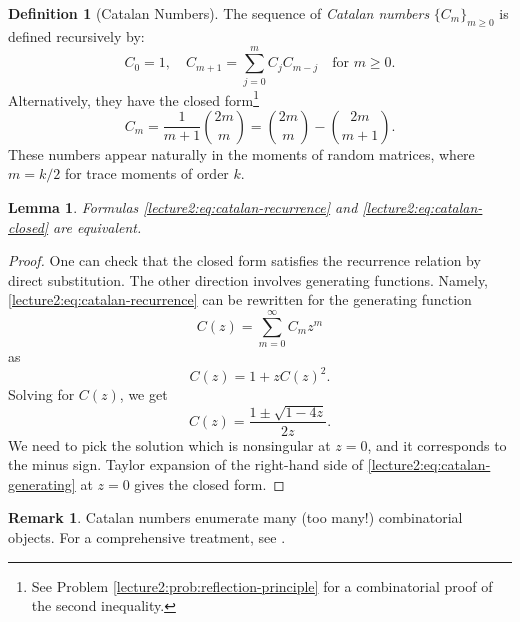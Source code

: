 \documentclass[letterpaper,11pt,oneside,reqno]{book}
\numberwithin{equation}{chapter}  %
\newtheorem{lemma}[proposition]{Lemma}
\theoremstyle{definition}
\newtheorem{definition}[proposition]{Definition}
\newtheorem{remark}[proposition]{Remark}
\begin{document}
\begin{definition}[Catalan Numbers]
The sequence of \emph{Catalan numbers} $\{C_m\}_{m\geq 0}$ is defined recursively by:
\begin{equation}
	\label{lecture2:eq:catalan-recurrence}
    C_0 = 1, \quad C_{m+1} = \sum_{j=0}^m C_j C_{m-j} \quad \text{for } m \geq 0.
\end{equation}
Alternatively, they have the closed form\footnote{See
	Problem \ref{lecture2:prob:reflection-principle} for a combinatorial proof
of the second inequality.}
\begin{equation}
	\label{lecture2:eq:catalan-closed}
    C_m = \frac{1}{m+1}\binom{2m}{m} =
		\binom{2m}{m} - \binom{2m}{m+1}.
\end{equation}
These numbers appear naturally in the moments of random matrices, where $m=k/2$ for trace moments of order $k$.
\end{definition}

\begin{lemma}
	\label{lecture2:lemma:equivalence-catalan}
	Formulas
	\eqref{lecture2:eq:catalan-recurrence} and \eqref{lecture2:eq:catalan-closed} are equivalent.
\end{lemma}
\begin{proof}
	One can check that the closed form satisfies the recurrence relation by direct substitution. The other direction
	involves generating functions. Namely,
	\eqref{lecture2:eq:catalan-recurrence} can be rewritten for the
	generating function
	\begin{equation*}
		C(z)=\sum_{m=0}^\infty C_m z^m
	\end{equation*}
	as
	\begin{equation*}
		C(z)=1+zC(z)^2.
	\end{equation*}
	Solving for $C(z)$, we get
	\begin{equation}
		\label{lecture2:eq:catalan-generating}
		C(z)=\frac{1\pm \sqrt{1-4z}}{2z}.
	\end{equation}
	We need to pick the solution which is nonsingular at $z=0$,
	and it corresponds to the minus sign.
	Taylor expansion of the right-hand side of
	\eqref{lecture2:eq:catalan-generating}
	at $z=0$
	gives the closed form.
\end{proof}

\begin{remark}
	\label{lecture2:rmk:stanley-catalans}
	Catalan numbers enumerate many (too many!) combinatorial objects. For a comprehensive treatment, see \cite{stanley2015catalan}.
\end{remark}
\end{document}
